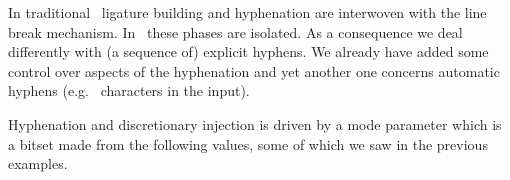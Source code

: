 \startplacefigure[reference=hb:3,title={\type{\null one\null two}}]
     {}
        {} {}
        {} {}
        {} {}
    \stopcombination
\stopplacefigure

\startplacefigure[reference=hb:4,title={\type{one\null two\null}}]
     {}
        {} {}
        {} {}
        {} {}
    \stopcombination
\stopplacefigure

\startplacefigure[reference=hb:5,title={\type{\null one\null two\null}}]
     {}
        {} {}
        {} {}
        {} {}
    \stopcombination
\stopplacefigure

In traditional \TEX\ ligature building and hyphenation are interwoven with the
line break mechanism. In \LUATEX\ these phases are isolated. As a consequence we
deal differently with (a sequence of) explicit hyphens. We already have added
some control over aspects of the hyphenation and yet another one concerns
automatic hyphens (e.g.\ \type {-} characters in the input).

Hyphenation and discretionary injection is driven by a mode parameter which is
a bitset made from the following values, some of which we saw in the previous
examples.

